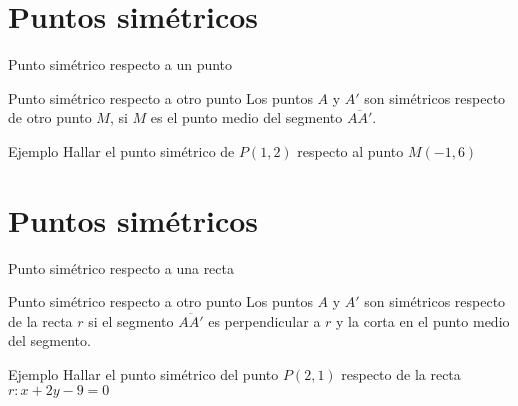 \documentclass[8pt]{beamer}
\begin{document}
\section{Puntos simétricos}
\begin{frame}[t]{Punto simétrico respecto a un punto}
\begin{alertblock}{Punto simétrico respecto a otro punto}
Los puntos $A$ y $A'$ son simétricos respecto de otro punto $M$, si $M$ es el punto medio del segmento $\overline{AA'}$.
\end{alertblock}

\pause

\begin{exampleblock}{Ejemplo}
Hallar el punto simétrico de $P(1,2)$ respecto al punto $M(-1,6)$
\end{exampleblock}
\end{frame}


\section{Puntos simétricos}
\begin{frame}[t]{Punto simétrico respecto a una recta}
\begin{alertblock}{Punto simétrico respecto a otro punto}
Los puntos $A$ y $A'$ son simétricos respecto de la recta $r$ si el segmento $\overline{AA'}$ es perpendicular a $r$ y la corta en el punto medio del segmento.
\end{alertblock}
\pause
\begin{exampleblock}{Ejemplo}
Hallar el punto simétrico del punto $P(2,1)$ respecto de la recta $r: x+2y-9=0$
\end{exampleblock}
\end{frame}
\end{document}

